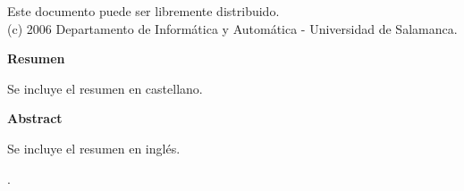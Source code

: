 \documentclass[12pt,a4paper,spanish,twoside]{article}
\begin{document}
\begin{flushleft}
\hspace{1cm}{\footnotesize Autor 4}\\
\hspace{1.5cm}{\footnotesize 1ª Línea Autor4 }\\
\hspace{1.5cm}{\footnotesize 2ª Línea Autor4}\\
\hspace{1.5cm}{\footnotesize 3ª Línea Autor4}\\
\hspace{1.5cm}{\footnotesize Correo Autor4}\\[0.5cm]

\vspace{2.7cm}

\vfill
Este documento puede ser libremente distribuido.\\
(c) 2006 Departamento de Informática y Automática - Universidad de Salamanca.
\end{flushleft}

\newpage
\renewcommand{\thepage}{\roman{page}} 
\setcounter{page}{1} 
\pagestyle{fancy}
\fancyhf{}
\fancyfoot[LE,RO]{\textbf{\thepage}}
\renewcommand{\headrulewidth}{0.0pt}
\renewcommand{\footrulewidth}{0.4pt}
\vspace{6.5cm}
\textbf{Resumen}

Se incluye el resumen en castellano.


\vspace{1cm}
\textbf{Abstract}

Se incluye el resumen en inglés.

\newpage
\setlength{\parskip}{0.8mm} %
\tableofcontents
\newpage
\listoffigures
\newpage
\listoftables

\setlength{\parskip}{2.5mm} %

\newpage

\renewcommand{\thepage}{} 
\ifodd\thepage
\else
  .
  \thispagestyle{empty} %
  \newpage 
\fi
\setcounter{page}{1}
\fancyhf{}
\end{document}
